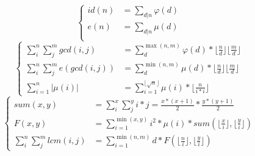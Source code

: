 \documentclass[10pt]{ctexart}
\begin{document}
{{\begin{equation}
    \left\{
        \begin{aligned}
            id(n) &= \sum_{d|n} \varphi(d) \\
            e(n) &= \sum_{d|n} \mu(d) \\
        \end{aligned} 
    \right.
\end{equation}
\begin{equation}
    \left\{
        \begin{aligned}
            \sum_i^n\sum_j^mgcd(i, j)&=\sum_d^{\max(n, m)}\varphi(d) * \lfloor\frac{n}{d}\rfloor\lfloor\frac{m}{d}\rfloor \\
            \sum_i^n\sum_j^me(gcd(i, j))&=\sum_d^{\min(n, m)}\mu(d) * \lfloor\frac{n}{d}\rfloor\lfloor\frac{m}{d}\rfloor \\
            \sum_{i = 1}^n |\mu(i)|&=\sum_{i = 1}^{\lfloor \sqrt{n} \rfloor}\mu(i)*\lfloor \frac{n}{i * i} \rfloor
        \end{aligned} 
    \right.
\end{equation}
\begin{equation}
    \left\{
        \begin{aligned} 
            sum(x, y) &= \sum_i^x\sum_j^yi*j=\frac{x*(x + 1)}{2} * \frac{y * (y + 1)}{2}\\
            F(x, y) &= \sum_{i = 1}^{\min(x, y)} i^2 * \mu(i) * sum(\lfloor\frac{x}{i}\rfloor, \lfloor\frac{y}{i}\rfloor) \\
            \sum_i^n\sum_j^mlcm(i, j) &= \sum_{i = 1}^{\min(n, m)} d * F(\lfloor\frac{n}{i}\rfloor, \lfloor\frac{y}{i}\rfloor)
        \end{aligned} 
    \right. 
\end{equation}
}}
\end{document}
